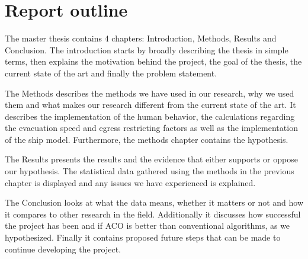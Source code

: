 
\section{Report outline}

The master thesis contains 4 chapters: Introduction, Methods, Results and Conclusion.               
The introduction starts by broadly describing the thesis in simple terms, then explains the motivation behind the project,
the goal of the thesis, the current state of the art and finally the problem statement. 

The Methods describes the methods we have used in our research, why we used them and what makes
our research different from the current state of the art. It describes the implementation of the human behavior,
the calculations regarding the evacuation speed and egress restricting factors as well as the implementation of the 
ship model. Furthermore, the methods chapter contains the hypothesis.

The Results presents the results and the evidence that either supports or oppose our hypothesis. The
statistical data gathered using the methods in the previous chapter is displayed and any issues we have experienced
is explained.

The Conclusion looks at what the data means, whether it matters or not and how it compares to other research in the field.
Additionally it discusses how successful the project has been and if ACO is better than conventional algorithms, as we hypothesized.
Finally it contains proposed future steps that can be made to continue developing the project.
